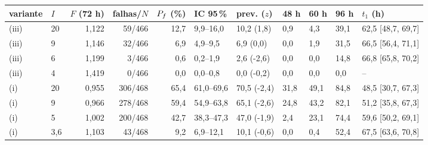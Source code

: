 \begin{tabular}{llrrrlllll l}
\toprule
variante & $I$ & $F$ (72 h) & falhas/$N$ & $P_f$ (\%) & IC 95\,\% & prev. ($z$) & 48 h & 60 h & 96 h & $t_1$ (h)\\
\midrule
(iii) & 20 & 1{,}122 & 59/466 & 12{,}7 & 9{,}9--16{,}0 & 10{,}2 (1{,}8) & 0{,}9 & 4{,}3 & 39{,}1 & 62{,}5 [48{,}7, 69{,}7]\\
(iii) & 9 & 1{,}146 & 32/466 & 6{,}9 & 4{,}9--9{,}5 & 6{,}9 (0{,}0) & 0{,}0 & 1{,}9 & 31{,}5 & 66{,}5 [56{,}4, 71{,}1]\\
(iii) & 6 & 1{,}199 & 3/466 & 0{,}6 & 0{,}2--1{,}9 & 2{,}6 (-2{,}6) & 0{,}0 & 0{,}0 & 14{,}8 & 66{,}8 [65{,}8, 70{,}2]\\
(iii) & 4 & 1{,}419 & 0/466 & 0{,}0 & 0{,}0--0{,}8 & 0{,}0 (-0{,}2) & 0{,}0 & 0{,}0 & 0{,}0 & --\\
\midrule
(i) & 20 & 0{,}955 & 306/468 & 65{,}4 & 61{,}0--69{,}6 & 70{,}5 (-2{,}4) & 31{,}8 & 49{,}1 & 84{,}8 & 48{,}5 [30{,}7, 67{,}3]\\
(i) & 9 & 0{,}966 & 278/468 & 59{,}4 & 54{,}9--63{,}8 & 65{,}1 (-2{,}6) & 24{,}8 & 43{,}2 & 82{,}1 & 51{,}2 [35{,}8, 67{,}3]\\
(i) & 5 & 1{,}002 & 200/468 & 42{,}7 & 38{,}3--47{,}3 & 47{,}0 (-1{,}9) & 2{,}4 & 23{,}1 & 74{,}4 & 59{,}6 [50{,}2, 69{,}1]\\
(i) & 3{,}6 & 1{,}103 & 43/468 & 9{,}2 & 6{,}9--12{,}1 & 10{,}1 (-0{,}6) & 0{,}0 & 0{,}4 & 52{,}4 & 67{,}5 [63{,}6, 70{,}8]\\
\bottomrule
\end{tabular}
